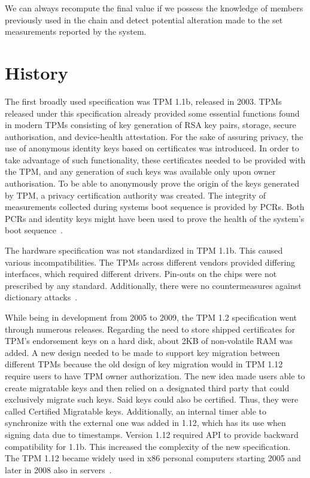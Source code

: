 We can always recompute the final value if we possess the knowledge of members previously used in the chain and detect potential alteration made to the set measurements reported by the system. 



\section{History}
The first broadly used specification was TPM 1.1b, released in 2003. TPMs released under this specification already provided some essential functions found in modern TPMs consisting of key generation of RSA key pairs, storage, secure authorisation, and device-health attestation. For the sake of assuring privacy, the
use of anonymous identity keys based on certificates was introduced. In order to take advantage of such
functionality, these certificates needed to be provided with the TPM, and any generation of such keys was available only upon owner authorisation. To be able to anonymously prove the origin of the keys generated
by TPM, a privacy certification authority was created. The integrity of measurements collected during systems boot sequence is provided by PCRs. Both PCRs and identity keys might have been used to prove the health of the system's boot sequence~\cite{arthur2015practical}.


The hardware specification was not standardized in TPM 1.1b. This caused various incompatibilities. The TPMs across different vendors provided differing interfaces, which required different drivers. Pin-outs on the chips were not prescribed by any standard. Additionally, there were no countermeasures against dictionary attacks~\cite{arthur2015practical}.

While being in development from 2005 to 2009, the TPM 1.2 specification went through numerous releases. Regarding the need to store shipped certificates for TPM's endorsement keys on a hard disk, about 2KB of non-volatile RAM was added. A new design needed to be made to support key migration between different TPMs because the old design of key migration would in TPM 1.12 require users to have TPM owner authorization. The new idea made users able to create migratable keys and then relied on a designated third party that could exclusively migrate such keys. Said keys could also be certified. Thus, they were called Certified Migratable keys. Additionally, an internal timer able to synchronize with the external one was added in 1.12, which has its use when signing data due to timestamps. Version 1.12 required API to provide backward compatibility for 1.1b. This increased the complexity of the new specification. The TPM 1.12 became widely used in x86 personal computers starting 2005 and later in 2008 also in servers~\cite{arthur2015practical}.

